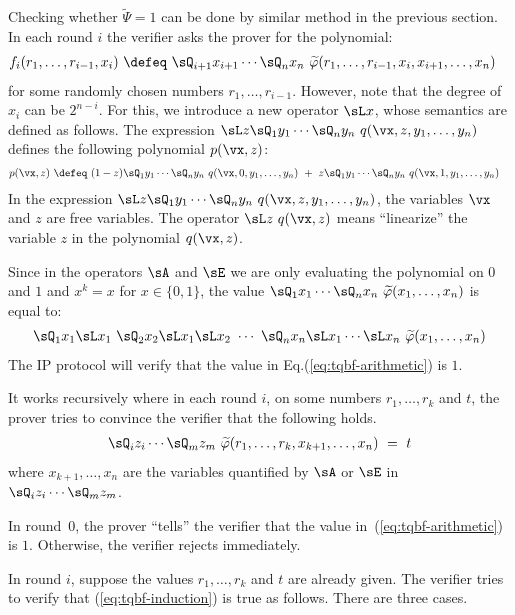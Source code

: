 \documentclass[11pt, a4paper]{article}
\begin{document}
Checking whether $\widetilde{\Psi}=1$ can be done by similar method in the previous section.
In each round $i$ the verifier asks the prover for the polynomial:
\begin{align*}
f_i(r_1,\ldots,r_{i-1},x_i) &\ \defeq \
\sQ_{i+1} x_{i+1} \cdots \sQ_n x_n \ \widetilde{\varphi}(r_1,\ldots,r_{i-1},x_i,x_{i+1},\ldots,x_n)
\end{align*}
for some randomly chosen numbers $r_1,\ldots,r_{i-1}$.
However, note that the degree of $x_i$ can be $2^{n-i}$.
For this, we introduce a new operator $\sL x$, whose semantics are defined as follows.
The expression $\sL z \sQ_1 y_1 \cdots  \sQ_n y_n\ q(\vx,z,y_1,\ldots,y_n)$
defines the following polynomial $p(\vx,z)$:
\begin{align*}
p(\vx,z) & \ \defeq \
(1 - z) \sQ_1y_1 \cdots \sQ_n y_n \ q(\vx,0,y_1,\ldots,y_n) \ + \
z \sQ_1y_1 \cdots \sQ_n y_n \ q(\vx,1,y_1,\ldots,y_n)
\end{align*}
In the expression $\sL z \sQ_1 y_1 \cdots  \sQ_n y_n\ q(\vx,z,y_1,\ldots,y_n)$,
the variables $\vx$ and $z$ are free variables.
The operator $\sL z\ q(\vx,z)$ means ``linearize'' the variable $z$ in the polynomial $q(\vx,z)$.

Since in the operators $\sA$ and $\sE$ we are only evaluating the polynomial on $0$ and $1$
and $x^k = x$ for $x\in \{0,1\}$, 
the value $\sQ_{1} x_{1} \cdots \sQ_n x_n \ \widetilde{\varphi}(x_1,\ldots,x_n)$ is equal to:
\begin{align}
\label{eq:tqbf-arithmetic}
\sQ_{1} x_{1} \sL x_1\ \sQ_2 x_2 \sL x_1 \sL x_2\ \cdots\
 \sQ_n x_n \sL x_1 \cdots \sL x_{n} \ \widetilde{\varphi}(x_1,\ldots,x_n) 
\end{align}
The IP protocol will verify that the value in Eq.(\ref{eq:tqbf-arithmetic}) is $1$.

It works recursively where in each round $i$, on some numbers $r_1,\ldots,r_k$ and $t$,
the prover tries to convince the verifier that the following holds.
\begin{align}
\label{eq:tqbf-induction}
\sQ_{i} z_i \cdots \sQ_m z_m \ \widetilde{\varphi}(r_1,\ldots,r_k,x_{k+1},\ldots,x_n)
\ = \ t
\end{align}
where $x_{k+1},\ldots,x_n$ are
the variables quantified by $\sA$ or $\sE$ in $\sQ_iz_i \cdots \sQ_mz_m$.

In round~0, the prover ``tells'' the verifier that the value in~(\ref{eq:tqbf-arithmetic}) is $1$.
Otherwise, the verifier rejects immediately.

In round $i$, suppose the values $r_1,\ldots,r_k$ and $t$ are already given.
The verifier tries to verify that (\ref{eq:tqbf-induction}) is true as follows.
There are three cases.
\end{document}
